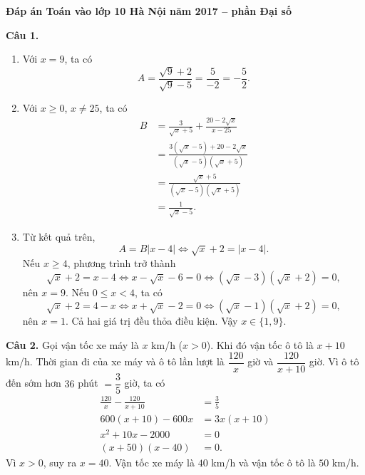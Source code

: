 \documentclass[12pt,a4paper]{article}
\begin{document}
\begin{center}
{\Large\bfseries Đáp án Toán vào lớp 10 Hà Nội năm 2017 -- phần Đại số}
\end{center}

\textbf{Câu 1.}
\begin{enumerate}[label=\alph*)]
  \item Với $x=9$, ta có
  \[
  A=\frac{\sqrt{9}+2}{\sqrt{9}-5}=\frac{5}{-2}=-\frac{5}{2}.
  \]
  \item Với $x\ge0$, $x\ne25$, ta có
  \begin{align*}
  B&=\frac{3}{\sqrt{x}+5}+\frac{20-2\sqrt{x}}{x-25}\\
   &=\frac{3(\sqrt{x}-5)+20-2\sqrt{x}}{(\sqrt{x}-5)(\sqrt{x}+5)}\\
   &=\frac{\sqrt{x}+5}{(\sqrt{x}-5)(\sqrt{x}+5)}\\
   &=\frac{1}{\sqrt{x}-5}.
  \end{align*}
  \item Từ kết quả trên,
  \[
  A=B|x-4|\Longleftrightarrow \sqrt{x}+2=|x-4|.
  \]
  Nếu $x\ge4$, phương trình trở thành
  \[
  \sqrt{x}+2=x-4\Longleftrightarrow x-\sqrt{x}-6=0
  \Longleftrightarrow (\sqrt{x}-3)(\sqrt{x}+2)=0,
  \]
  nên $x=9$.
  Nếu $0\le x<4$, ta có
  \[
  \sqrt{x}+2=4-x\Longleftrightarrow x+\sqrt{x}-2=0
  \Longleftrightarrow (\sqrt{x}-1)(\sqrt{x}+2)=0,
  \]
  nên $x=1$. Cả hai giá trị đều thỏa điều kiện. Vậy $x\in\{1,9\}$.
\end{enumerate}

\textbf{Câu 2.} Gọi vận tốc xe máy là $x$ km/h ($x>0$). Khi đó vận tốc ô tô là $x+10$ km/h. Thời gian đi của xe máy và ô tô lần lượt là $\dfrac{120}{x}$ giờ và $\dfrac{120}{x+10}$ giờ. Vì ô tô đến sớm hơn $36$ phút $=\dfrac35$ giờ, ta có
\begin{align*}
\frac{120}{x}-\frac{120}{x+10}&=\frac35\\
600(x+10)-600x&=3x(x+10)\\
x^2+10x-2000&=0\\
(x+50)(x-40)&=0.
\end{align*}
Vì $x>0$, suy ra $x=40$. Vận tốc xe máy là $40$ km/h và vận tốc ô tô là $50$ km/h.
\end{document}
